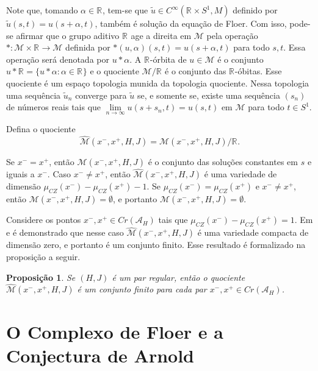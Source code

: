 \documentclass[12pt]{book}
\newtheorem{proposicao}[teorema]{Proposição}
\newcommand{\aplicaoessuaves}[2]{C^{\infty}(#1, #2)}
\newcommand{\circulo}{S^{1}}
\newcommand{\energiafinitaM}{\mathcal{M}}
\newcommand{\funcionalH}{\mathcal{A}_{H}}
\newcommand{\iconley}[1]{\iconleyabrev(#1)}
\newcommand{\iconleyabrev}{\mu_{CZ}}
\newcommand{\pontoscriticos}[1]{\textit{Cr}(#1)}
\newcommand{\quocientetrajetorias}{\widehat{\energiafinitaM}(x^{-}, x^{+}, H, J)}
\newcommand{\retacartesianocirculo}{\real{} \times \circulo}
\newcommand{\real}[1]{\mathbb{R}^{#1}}
\newcommand{\reta}{\real{}}
\begin{document}
	
	Note que, tomando $\alpha\in \reta$, tem-se que $\tilde{u}\in \aplicaoessuaves{\retacartesianocirculo}{M}$ definido por $ \tilde{u}(s,t)=u(s+\alpha,t)$, também é solução da equação de Floer. Com isso, pode-se afirmar que o grupo aditivo $\reta$ age a direita em $\energiafinitaM$ pela operação $*:\energiafinitaM\times \reta\to \energiafinitaM$ definida por $*(u,\alpha)(s,t) = u(s+\alpha,t)$ para todo $s,t$. Essa operação será denotada por $u*\alpha$. A $\reta$-órbita de $u \in \energiafinitaM$ é o conjunto $u*\reta = \{u*\alpha  : \alpha\in \reta\}$ e o quociente $\energiafinitaM/\reta$ é o conjunto das $\reta$-óbitas. Esse quociente é um espaço topologia munida da topologia quociente. Nessa topologia uma sequência $\tilde{u}_{n}$ converge para $\tilde{u}$ se, e somente se, existe uma sequência $(s_{n})$ de números reais tais que $\lim\limits_{n\to \infty}u(s+s_{n}, t) = u(s,t)$ em $\energiafinitaM$ para todo $t \in \circulo$.
	
	Defina o quociente 
	$$\quocientetrajetorias=\energiafinitaM(x^{-},x^{+}, H, J)/\reta.
	$$

	Se $x^{-}=x^{+}$, então $\energiafinitaM(x^{-},x^{+}, H, J)$ é o conjunto das soluções constantes em $s$ e iguais a $x^{-}$. Caso $x^{-}\neq x^{+}$, então $\quocientetrajetorias$ é uma variedade de dimensão $\iconley{x^{-}}-\iconley{x^{+}}-1$. Se $\iconley{x^{-}}=\iconley{x^{+}}$ e $x^{-}\neq x^{+}$, então $\energiafinitaM(x^{-},x^{+}, H, J)=\emptyset$, e portanto $\quocientetrajetorias=\emptyset$.

	Considere os pontos $x^{-}, x^{+} \in \pontoscriticos{\funcionalH}$ tais que $\iconley{x^{-}}-\iconley{x^{+}}=1$. Em \cite{audi_floer_homology} e \cite{salamon_lecture} é demonstrado que nesse caso $\quocientetrajetorias$ é uma variedade compacta de dimensão zero, e portanto é um conjunto finito. Esse resultado é formalizado na proposição a seguir.

	\begin{proposicao}\label{proposicao_quociente_orbitas_finitas}
		Se $(H,J)$ é um par regular, então o quociente $\widehat{\energiafinitaM}(x^{-},x^{+}, H, J)$ é um conjunto finito para cada par $x^{-}, x^{+} \in \pontoscriticos{\funcionalH}$.
	\end{proposicao}
	
	\section{O Complexo de Floer e a Conjectura de Arnold}\label{secao_complexo_floer}
	
\end{document}

